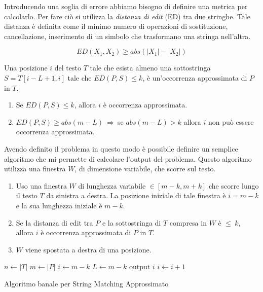Introducendo una soglia di errore abbiamo bisogno di definire una metrica per
calcolarlo. Per fare ciò si utilizza la \textit{distanza di edit} (ED) tra due
stringhe. Tale distanza è definita come il minimo numero di operazioni di sostituzione,
cancellazione, inserimento di un simbolo che trasformano una stringa nell'altra.
\begin{nota}
    \begin{equation}
        ED(X_1, X_2) \geq abs(|X_1| - |X_2|)
    \end{equation}
\end{nota}
\begin{definizione}
    Una posizione $i$ del testo $T$ tale che esista almeno una sottostringa
    $S = T[i - L + 1,i]$ tale che $ED(P, S) \leq k$, è un'occorrenza approssimata di $P$ in $T$.
\end{definizione}
\begin{nota}
    \begin{enumerate}
        \item Se $ED(P, S) \leq k$, allora $i$ è occorrenza approssimata.
        \item $ED(P, S) \geq abs(m - L) \ \Rightarrow \ $se $abs(m - L) > k$
              allora $i$ non può essere occorrenza approssimata.
    \end{enumerate}
\end{nota}

Avendo definito il problema in questo modo è possibile definire un semplice
algoritmo che mi permette di calcolare l'output del problema. Questo algoritmo
utilizza una finestra $W$, di dimensione variabile, che scorre sul testo.
\begin{enumerate}
    \item Uso una finestra $W$ di lunghezza variabile $\in [m - k, m + k]$ che
          scorre lungo il testo $T$ da sinistra a destra. La posizione iniziale di tale
          finestra è $i = m - k$ e la sua lunghezza iniziale è $m - k$.
    \item Se la distanza di edit tra $P$ e la sottostringa di $T$ compresa in
          $W$ è $\leq \ k$, allora $i$ è occorrenza approssimata di $P$ in $T$.
    \item $W$ viene spostata a destra di una posizione.
\end{enumerate}
\begin{algorithm}
    \begin{algorithmic}
        \State $n\gets |T|$
        \State $m \gets |P|$
        \State $i\gets m - k$
        \State $L \gets  m - k$
        \State $\text{output } i$
        \EndIf
        \EndWhile
        \State $i \gets i + 1$
        \EndWhile
        \EndFunction
    \end{algorithmic}
    \caption{Algoritmo banale per String Matching Approssimato}
\end{algorithm}

